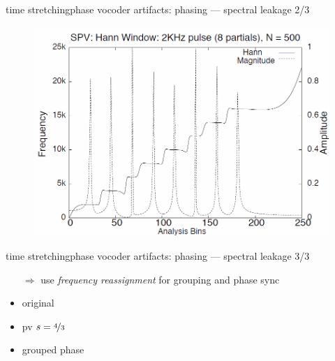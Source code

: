 	\begin{frame}{time stretching}{phase vocoder artifacts: phasing --- spectral leakage 2/3}
			\begin{figure}
				\centerline{\includegraphics[scale=.4]{graph/instfreq}}
			\end{figure}
    \end{frame}
	\begin{frame}{time stretching}{phase vocoder artifacts: phasing --- spectral leakage 3/3}
                \begin{itemize}
                    \item[$\Rightarrow$] use \textit{frequency reassignment} for grouping and phase sync
                \end{itemize}
                \bigskip
                        \begin{itemize}
                            \item   original  
                            \item   pv $s = \nicefrac{4}{3}$ 
                            \item   grouped phase 
                        \end{itemize}
    \end{frame}
